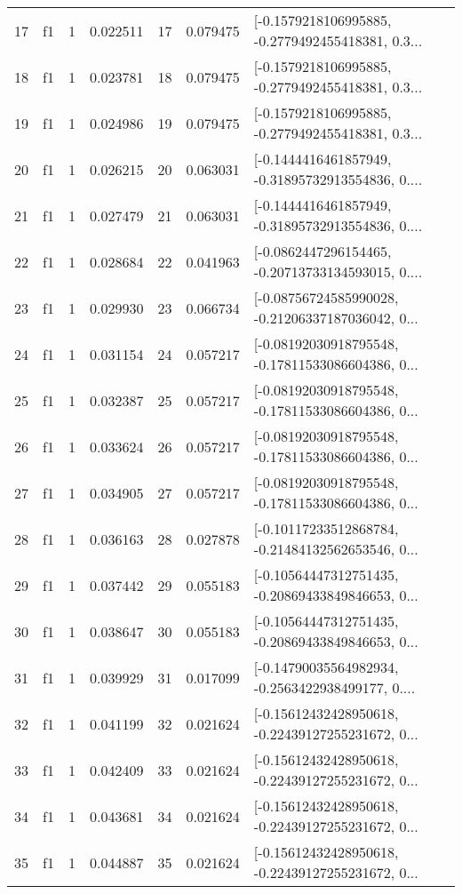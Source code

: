 \begin{tabular}{lllrlrl}
17  &  f1 &   1 &  0.022511 &   17 &  0.079475 &  [-0.1579218106995885, -0.2779492455418381, 0.3... \\
18  &  f1 &   1 &  0.023781 &   18 &  0.079475 &  [-0.1579218106995885, -0.2779492455418381, 0.3... \\
19  &  f1 &   1 &  0.024986 &   19 &  0.079475 &  [-0.1579218106995885, -0.2779492455418381, 0.3... \\
20  &  f1 &   1 &  0.026215 &   20 &  0.063031 &  [-0.1444416461857949, -0.31895732913554836, 0.... \\
21  &  f1 &   1 &  0.027479 &   21 &  0.063031 &  [-0.1444416461857949, -0.31895732913554836, 0.... \\
22  &  f1 &   1 &  0.028684 &   22 &  0.041963 &  [-0.0862447296154465, -0.20713733134593015, 0.... \\
23  &  f1 &   1 &  0.029930 &   23 &  0.066734 &  [-0.08756724585990028, -0.21206337187036042, 0... \\
24  &  f1 &   1 &  0.031154 &   24 &  0.057217 &  [-0.08192030918795548, -0.17811533086604386, 0... \\
25  &  f1 &   1 &  0.032387 &   25 &  0.057217 &  [-0.08192030918795548, -0.17811533086604386, 0... \\
26  &  f1 &   1 &  0.033624 &   26 &  0.057217 &  [-0.08192030918795548, -0.17811533086604386, 0... \\
27  &  f1 &   1 &  0.034905 &   27 &  0.057217 &  [-0.08192030918795548, -0.17811533086604386, 0... \\
28  &  f1 &   1 &  0.036163 &   28 &  0.027878 &  [-0.10117233512868784, -0.21484132562653546, 0... \\
29  &  f1 &   1 &  0.037442 &   29 &  0.055183 &  [-0.10564447312751435, -0.20869433849846653, 0... \\
30  &  f1 &   1 &  0.038647 &   30 &  0.055183 &  [-0.10564447312751435, -0.20869433849846653, 0... \\
31  &  f1 &   1 &  0.039929 &   31 &  0.017099 &  [-0.14790035564982934, -0.2563422938499177, 0.... \\
32  &  f1 &   1 &  0.041199 &   32 &  0.021624 &  [-0.15612432428950618, -0.22439127255231672, 0... \\
33  &  f1 &   1 &  0.042409 &   33 &  0.021624 &  [-0.15612432428950618, -0.22439127255231672, 0... \\
34  &  f1 &   1 &  0.043681 &   34 &  0.021624 &  [-0.15612432428950618, -0.22439127255231672, 0... \\
35  &  f1 &   1 &  0.044887 &   35 &  0.021624 &  [-0.15612432428950618, -0.22439127255231672, 0... \\

\end{tabular}

